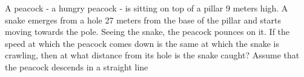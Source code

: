 
%
%
%
%
% 

\question[6] A peacock - a hungry peacock - is sitting on top of a pillar 9 meters high.
A snake emerges from a hole 27 meters from the base of the pillar and starts moving 
towards the pole. Seeing the snake, the peacock pounces on it. If the speed at which 
the peacock comes down is the same at which the snake is crawling, then at what distance
from its hole is the snake caught? Assume that the peacock descends in a straight line                          

\ifprintanswers
\fi 

